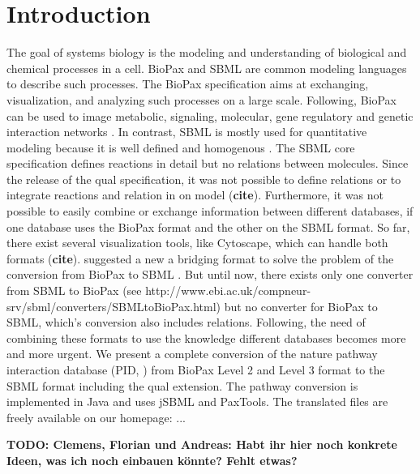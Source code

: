 \documentclass{bioinfo}
\begin{document}
\section{Introduction}
The goal of systems biology is the modeling and understanding of biological and chemical processes in a cell. BioPax and SBML are common modeling languages to describe such processes. The BioPax specification aims at exchanging, visualization, and analyzing such processes on a large scale. Following, BioPax can be used to image metabolic, signaling, molecular, gene regulatory and genetic interaction networks \citep{Demir2010}. In contrast, SBML is mostly used for quantitative modeling because it is well defined and homogenous \citep{Hucka2003}. The SBML core specification defines reactions in detail but no relations between molecules.
Since the release of the qual specification, it was not possible to define relations or to integrate reactions and relation in on model (\textbf{cite}).
Furthermore, it was not possible to easily combine or exchange information between different databases, if one database uses the BioPax format and the other on the SBML format.
So far, there exist several visualization tools, like Cytoscape, which can handle both formats (\textbf{cite}). \citet*{Ruebenacker2009} suggested a new a bridging format to solve the problem of the conversion from BioPax to SBML \citep{Ruebenacker2009}. But until now, there exists only one converter from SBML to BioPax (see http://www.ebi.ac.uk/compneur-srv/sbml/converters/SBMLtoBioPax.html) but no converter for BioPax to SBML, which's conversion also includes relations. Following, the need of combining these formats to use the knowledge different databases becomes more and more urgent.
We present a complete conversion of the nature pathway interaction database (PID, \cite{Schaefer2009}) from BioPax Level 2 and Level 3 format to the SBML format including the qual extension. The pathway conversion is implemented in Java and uses jSBML and PaxTools. The translated files are freely available on our homepage: ...

\textbf{TODO: Clemens, Florian und Andreas: Habt ihr hier noch konkrete Ideen, was ich noch einbauen k\"onnte? Fehlt etwas?}
\end{document}
